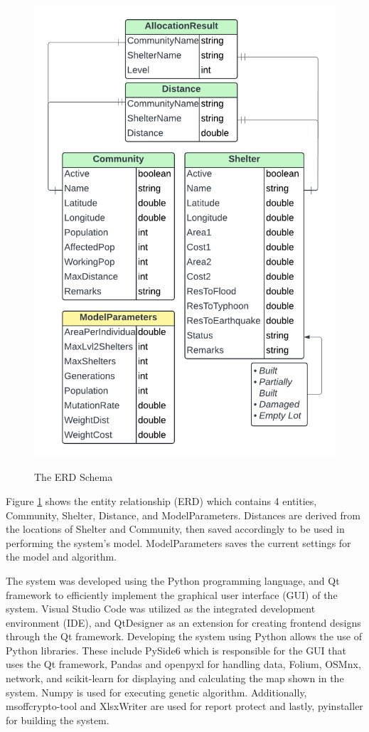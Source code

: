 \documentclass[12pt,a4paper,]{article}
\begin{document}
	\begin{figure}[h!]
		\caption{The ERD Schema}
		\centering
		\includegraphics[width=\columnwidth]{ERD compress}
		\label{ERD}
	\end{figure}
	Figure \ref{ERD} shows the entity relationship (ERD) which contains 4 entities, Community, Shelter, Distance, and ModelParameters. Distances are derived from the locations of Shelter and Community, then saved accordingly to be used in performing the system’s model. ModelParameters saves the current settings for the model and algorithm.
	
	The system was developed using the Python programming language, and Qt framework to efficiently implement the graphical user interface (GUI) of the system. Visual Studio Code was utilized as the integrated development environment (IDE), and QtDesigner as an extension for creating frontend designs through the Qt framework.
	Developing the system using Python allows the use of Python libraries. These include PySide6 which is responsible for the GUI that uses the Qt framework, Pandas and openpyxl for handling data, Folium, OSMnx, network, and scikit-learn for displaying and calculating the map shown in the system. Numpy is used for executing genetic algorithm. Additionally, msoffcrypto-tool and XlsxWriter are used for report protect and lastly, pyinstaller for building the system.
	
\end{document}
